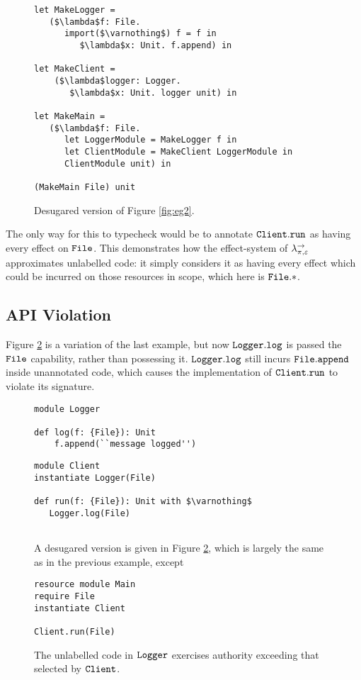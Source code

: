 \begin{figure}[h]

\begin{lstlisting}
let MakeLogger =
   ($\lambda$f: File.
      import($\varnothing$) f = f in
         $\lambda$x: Unit. f.append) in

let MakeClient =
	($\lambda$logger: Logger.
	   $\lambda$x: Unit. logger unit) in

let MakeMain =
   ($\lambda$f: File.
      let LoggerModule = MakeLogger f in
      let ClientModule = MakeClient LoggerModule in
      ClientModule unit) in

(MakeMain File) unit
\end{lstlisting}

\caption{Desugared version of Figure \ref{fig:eg2}.}
\label{fig:eg2_desugared}
\end{figure}

The only way for this to typecheck would be to annotate $\mathtt{Client.run}$ as having every effect on $\mathtt{File}$. This demonstrates how the effect-system of $\lambda^{\rightarrow}_{\pi, \varepsilon}$ approximates unlabelled code: it simply considers it as having every effect which could be incurred on those resources in scope, which here is $\mathtt{File}.*$.

\subsection{API Violation}

Figure \ref{fig:eg3} is a variation of the last example, but now $\mathtt{Logger.log}$ is passed the $\mathtt{File}$ capability, rather than possessing it. $\mathtt{Logger.log}$ still incurs $\mathtt{File.append}$ inside unannotated code, which causes the implementation of $\mathtt{Client.run}$ to violate its signature.

\begin{figure}[h]

\begin{lstlisting}
module Logger

def log(f: {File}): Unit
    f.append(``message logged'')
\end{lstlisting}

\begin{lstlisting}
module Client
instantiate Logger(File)

def run(f: {File}): Unit with $\varnothing$
   Logger.log(File)
   
\end{lstlisting}

A desugared version is given in Figure \ref{fig:eg3}, which is largely the same as in the previous example, except 

\begin{lstlisting}
resource module Main
require File
instantiate Client

Client.run(File)
\end{lstlisting}

\caption{The unlabelled code in $\mathtt{Logger}$ exercises authority exceeding that selected by $\mathtt{Client}$.}
\label{fig:eg3}
\end{figure}




